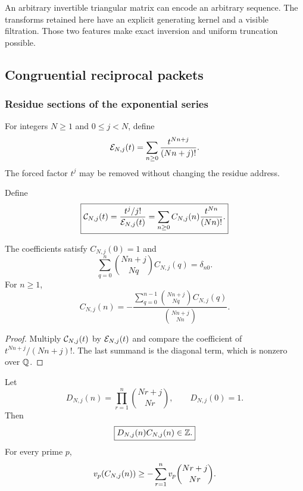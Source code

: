 \begin{histremark}\label{hist:rem:triangular_freedom}
An arbitrary invertible triangular matrix can encode an arbitrary sequence. The transforms retained here have an explicit generating kernel and a visible filtration. Those two features make exact inversion and uniform truncation possible.
\end{histremark}

\subsection{Congruential reciprocal packets}\label{hist:sec:congruential}

\subsubsection{Residue sections of the exponential series}

For integers \(N\geq1\) and \(0\leq j<N\), define
\[
\mathcal E_{N,j}(t)
=
\sum_{n\geq0}
\frac{t^{Nn+j}}{(Nn+j)!}.
\]
The forced factor \(t^j\) may be removed without changing the residue address.

\begin{histdefinition}\label{hist:def:congruential_packet}
Define
\[
\boxed{
\mathcal C_{N,j}(t)
=
\frac{t^j/j!}{\mathcal E_{N,j}(t)}
=
\sum_{n\geq0}
C_{N,j}(n)
\frac{t^{Nn}}{(Nn)!}.
}
\]
\end{histdefinition}

\begin{histtheorem}\label{hist:thm:triangular_inverse}
The coefficients satisfy \(C_{N,j}(0)=1\) and
\[
\boxed{
\sum_{q=0}^{n}
\binom{Nn+j}{Nq}
C_{N,j}(q)
=
\delta_{n0}.
}
\]
For \(n\geq1\),
\[
\boxed{
C_{N,j}(n)
=
-
\frac{
\sum_{q=0}^{n-1}
\binom{Nn+j}{Nq}C_{N,j}(q)
}{
\binom{Nn+j}{Nn}
}.
}
\]
\end{histtheorem}

\begin{proof}
Multiply \(\mathcal C_{N,j}(t)\) by \(\mathcal E_{N,j}(t)\) and compare the coefficient of \(t^{Nn+j}/(Nn+j)!\). The last summand is the diagonal term, which is nonzero over \(\mathbb Q\).
\end{proof}

\begin{histproposition}\label{hist:prop:denominator_bound}
Let
\[
D_{N,j}(n)
=
\prod_{r=1}^{n}
\binom{Nr+j}{Nr},
\qquad
D_{N,j}(0)=1.
\]
Then
\[
\boxed{
D_{N,j}(n)C_{N,j}(n)
\in
\mathbb Z.
}
\]
For every prime \(p\),
\[
v_p(C_{N,j}(n))
\geq
-
\sum_{r=1}^{n}
v_p\binom{Nr+j}{Nr}.
\]
\end{histproposition}

